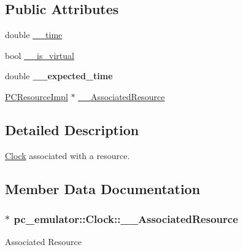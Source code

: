 \subsection*{Public Attributes}
\begin{DoxyCompactItemize}
\item 
double \hyperlink{classpc__emulator_1_1Clock_ad9198c0f45039a5b22c1404bdd245679}{\+\_\+\+\_\+time}
\item 
bool \hyperlink{classpc__emulator_1_1Clock_a0f6af10c0d261885b85149902e273725}{\+\_\+\+\_\+is\+\_\+virtual}
\item 
double {\bfseries \+\_\+\+\_\+expected\+\_\+time}\hypertarget{classpc__emulator_1_1Clock_a7adf6bf1c1ad60171c37fc2e86932b12}{}\label{classpc__emulator_1_1Clock_a7adf6bf1c1ad60171c37fc2e86932b12}

\item 
\hyperlink{classpc__emulator_1_1PCResourceImpl}{P\+C\+Resource\+Impl} $\ast$ \hyperlink{classpc__emulator_1_1Clock_aba91d4760a2681b29264c021b519b10b}{\+\_\+\+\_\+\+Associated\+Resource}
\end{DoxyCompactItemize}


\subsection{Detailed Description}
\hyperlink{classpc__emulator_1_1Clock}{Clock} associated with a resource. 

\subsection{Member Data Documentation}
\subsubsection[{\texorpdfstring{\+\_\+\+\_\+\+Associated\+Resource}{__AssociatedResource}}]{$\ast$ pc\+\_\+emulator\+::\+Clock\+::\+\_\+\+\_\+\+Associated\+Resource}\hypertarget{classpc__emulator_1_1Clock_aba91d4760a2681b29264c021b519b10b}{}\label{classpc__emulator_1_1Clock_aba91d4760a2681b29264c021b519b10b}
Associated Resource 
